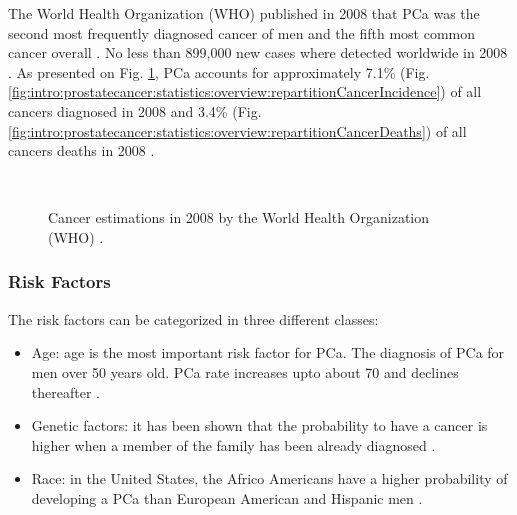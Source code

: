 The World Health Organization (WHO) published in 2008 that PCa was the second most frequently diagnosed cancer of men and the fifth most common cancer overall \cite{Ferlay2010}. No less than 899,000 new cases where detected worldwide in 2008 \cite{Ferlay2010}. As presented on Fig. \ref{fig:intro:prostatecancer:statistics:overview:repartitionCancer}, PCa accounts for approximately 7.1\% (Fig. \ref{fig:intro:prostatecancer:statistics:overview:repartitionCancerIncidence}) of all cancers diagnosed in 2008 and 3.4\% (Fig. \ref{fig:intro:prostatecancer:statistics:overview:repartitionCancerDeaths}) of all cancers deaths in 2008 \cite{Ferlay2010}.

\begin{figure}
	\centering
	~
	\caption{Cancer estimations in 2008 by the World Health Organization (WHO) \cite{Ferlay2010}.}
	\label{fig:intro:prostatecancer:statistics:overview:repartitionCancer}
\end{figure}

\subsubsection{Risk Factors}\label{subsubsection:intro:prostatecancer:statistics:riskfactors}

The risk factors can be categorized in three different classes: 

\begin{itemize}
	\item Age: age is the most important risk factor for PCa. The diagnosis of PCa for men over 50 years old. PCa rate increases upto about 70 and declines thereafter \cite{AmericanCancerSociety2010}.
	\item Genetic factors: it has been shown that the probability to have a cancer is higher when a member of the family has been already diagnosed \cite{AmericanCancerSociety2010}.
	\item Race: in the United States, the Africo Americans have a higher probability of developing a PCa than European American and Hispanic men \cite{AmericanCancerSociety2010}.
\end{itemize}

